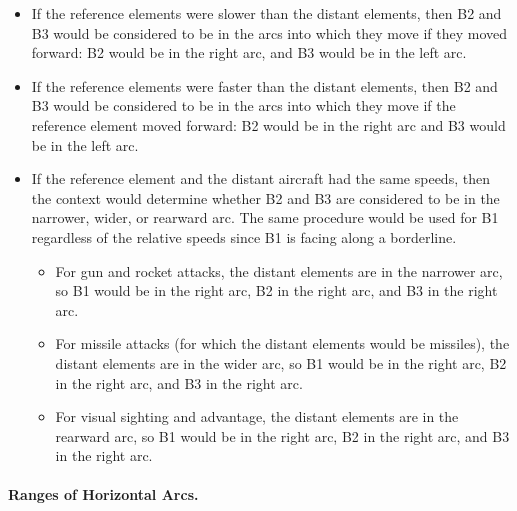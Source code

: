 {\begin{itemize}
\begin{itemize}
\item
If the reference elements were slower than the distant elements, then B2 and B3 would be considered to be in the arcs into which they move if they moved forward: B2 would be in the right  arc, and B3 would be in the left  arc.

\item
If the reference elements were faster than the distant elements, then B2 and B3 would be considered to be in the arcs into which they move if the reference element moved forward: B2 would be in the right  arc and B3 would be in the left  arc.

\item
If the reference element and the distant aircraft had the same speeds, then the context would determine whether B2 and B3 are considered to be in the narrower, wider, or rearward arc. The same procedure would be used for B1 regardless of the relative speeds since B1 is facing along a borderline.

\begin{itemize}

\item For gun and rocket attacks, the distant elements are in the narrower arc, so B1 would be in the right  arc, B2 in the right  arc, and B3 in the right  arc.

\item For missile attacks (for which the distant elements would be missiles), the distant elements are in the wider arc, so B1 would be in the right  arc, B2 in the right  arc, and B3 in the right  arc.

\item For visual sighting and advantage, the distant elements are in the rearward arc, so B1 would be in the right  arc, B2 in the right  arc, and B3 in the right  arc.

\end{itemize}

\end{itemize}

\end{itemize}


\paragraph{Ranges of Horizontal Arcs.}
\label{rule:ranges-of-angle-off-arcs}

}
